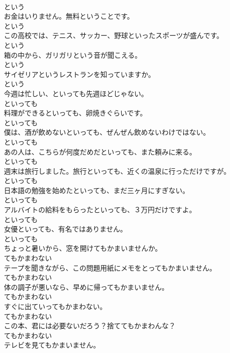 \documentclass[8pt]{extreport}
\begin{document}
\begin{CJK}{UTF8}{min}
\\	という
\\	お金はいりません。無料ということです。	
\\	という
\\	この高校では、テニス、サッカー、野球といったスポーツが盛んです。	
\\	という
\\	箱の中から、ガリガリという音が聞こえる。	
\\	という
\\	サイゼリアというレストランを知っていますか。	
\\	という
\\	今週は忙しい、といっても先週ほどじゃない。	
\\	といっても
\\	料理ができるといっても、卵焼きぐらいです。	
\\	といっても
\\	僕は、酒が飲めないといっても、ぜんぜん飲めないわけではない。	
\\	といっても
\\	あの人は、こちらが何度だめだといっても、また頼みに来る。	
\\	といっても
\\	週末は旅行しました。旅行といっても、近くの温泉に行っただけですが。	
\\	といっても
\\	日本語の勉強を始めたといっても、まだ三ヶ月にすぎない。	
\\	といっても
\\	アルバイトの給料をもらったといっても、３万円だけですよ。	
\\	といっても
\\	女優といっても、有名ではありません。	
\\	といっても
\\	ちょっと暑いから、窓を開けてもかまいませんか。	
\\	てもかまわない
\\	テープを聞きながら、この問題用紙にメモをとってもかまいません。	
\\	てもかまわない
\\	体の調子が悪いなら、早めに帰ってもかまいません。	
\\	てもかまわない
\\	すぐに出ていってもかまわない。	
\\	てもかまわない
\\	この本、君には必要ないだろう？捨ててもかまわんな？	
\\	てもかまわない
\\	テレビを見てもかまいません。	

\end{CJK}
\end{document}
